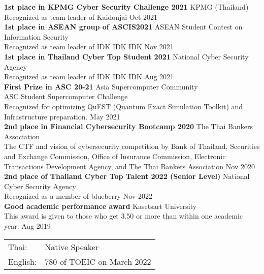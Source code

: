 \textbf{1st place in KPMG Cyber Security Challenge 2021} \hfill KPMG (Thailand)\\
Recognized as team leader of Kaidonjai \hfill Oct 2021\\
\vspace*{2mm}
\textbf{1st place in ASEAN group of ASCIS2021} \hfill ASEAN Student Contest on Information Security\\
Recognized as team leader of IDK IDK IDK \hfill Nov 2021\\
\vspace*{2mm}
\textbf{1st place in Thailand Cyber Top Student 2021} \hfill National Cyber Security Agency\\
Recognized as team leader of IDK IDK IDK \hfill Aug 2021\\
\vspace*{2mm}
\textbf{First Prize in ASC 20-21} \hfill Asia Supercomputer Community\\
ASC Student Supercomputer Challenge\\
Recognized for optimizing QuEST (Quantum Exact Simulation Toolkit) and Infrastructure preparation. \hfill May 2021\\
\vspace*{2mm}
\textbf{2nd place in Financial Cybersecurity Bootcamp 2020} \hfill The Thai Bankers\textquotesingle{} Association\\
The CTF and vision of cybersecurity competition by Bank of Thailand, Securities and Exchange Commission, Office of Insurance Commission, Electronic Transactions Development Agency, and The Thai Bankers\textquotesingle{} Association \hfill Nov 2020\\
\vspace*{2mm}
\textbf{2nd place of Thailand Cyber Top Talent 2022 (Senior Level)} \hfill National Cyber Security Agency\\
Recognized as a member of blueberry \hfill Nov 2022\\
\vspace*{2mm}
\textbf{Good academic performance award} \hfill Kasetsart University\\
This award is given to those who get 3.50 or more than within one academic year. \hfill Aug 2019\\
\vspace*{2mm}


\begin{tabular}{ l l }
	Thai: & Native Speaker\\
	English:            & 780 of TOEIC on March 2022\\
\end{tabular}
\vspace{2mm}


